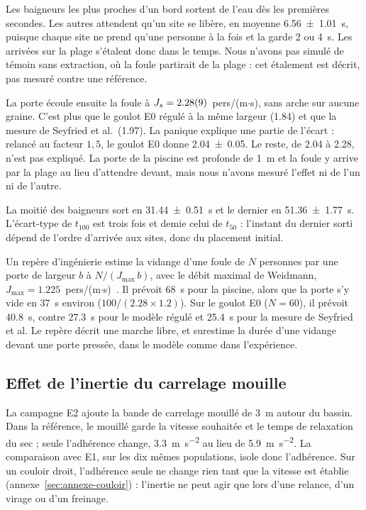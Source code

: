 Les baigneurs les plus proches d'un bord sortent de l'eau dès les premières secondes. Les
autres attendent qu'un site se libère, en moyenne \SI{6.56 \pm 1.01}{\second}, puisque chaque
site ne prend qu'une personne à la fois et la garde 2 ou \SI{4}{\second}. Les arrivées sur la
plage s'étalent donc dans le temps. Nous n'avons pas simulé de témoin sans extraction, où la
foule partirait de la plage : cet étalement est décrit, pas mesuré contre une référence.

La porte écoule ensuite la foule à $J_s=\num{2.28 \pm 0.09}$~pers/(m$\cdot$s), sans arche sur
aucune graine. C'est plus que le goulot E0 régulé à la même largeur (\num{1.84}) et que la
mesure de Seyfried et al.\ (\num{1.97}). La panique explique une partie de l'écart : relancé
au facteur $1{,}5$, le goulot E0 donne \num{2.04 \pm 0.05}. Le reste, de \num{2.04} à
\num{2.28}, n'est pas expliqué. La porte de la piscine est profonde de \SI{1}{\metre} et la
foule y arrive par la plage au lieu d'attendre devant, mais nous n'avons mesuré l'effet ni de
l'un ni de l'autre.

La moitié des baigneurs sort en \SI{31.44 \pm 0.51}{\second} et le dernier en
\SI{51.36 \pm 1.77}{\second}. L'écart-type de $t_{100}$ est trois fois et demie celui de
$t_{50}$ : l'instant du dernier sorti dépend de l'ordre d'arrivée aux sites, donc du placement
initial.

Un repère d'ingénierie estime la vidange d'une foule de $N$ personnes par une porte de
largeur $b$ à $N/(J_{\max}\,b)$, avec le débit maximal de Weidmann,
$J_{\max}=\num{1.225}$~pers/(m$\cdot$s)~\cite[p.~63--64]{weidmann1993}. Il prévoit
\SI{68}{\second} pour la piscine, alors que la porte s'y vide en \SI{37}{\second} environ
($100/(\num{2.28}\times\num{1.2})$). Sur le goulot E0 ($N=60$), il prévoit \SI{40.8}{\second},
contre \SI{27.3}{\second} pour le modèle régulé et \SI{25.4}{\second} pour la mesure de
Seyfried et al. Le repère décrit une marche libre, et surestime la durée d'une vidange devant
une porte pressée, dans le modèle comme dans l'expérience.

\subsection{Effet de l'inertie du carrelage mouille}
\label{sec:e2}

La campagne E2 ajoute la bande de carrelage mouillé de \SI{3}{\metre} autour du bassin. Dans
la référence, le mouillé garde la vitesse souhaitée et le temps de relaxation du sec ; seule
l'adhérence change, \SI{3.3}{\metre\per\second\squared} au lieu de \SI{5.9}{\metre\per\second\squared}.
La comparaison avec E1, sur les dix mêmes populations, isole donc l'adhérence. Sur un couloir
droit, l'adhérence seule ne change rien tant que la vitesse est établie
(annexe~\ref{sec:annexe-couloir}) : l'inertie ne peut agir que lors d'une relance, d'un virage
ou d'un freinage.

